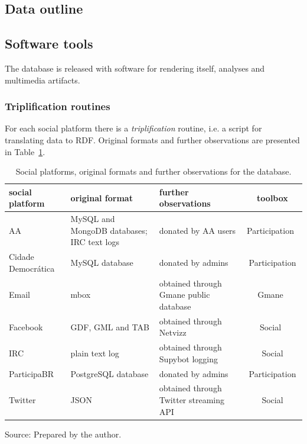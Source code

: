 \subsection{Data outline}


\subsection{Software tools}
The database is released with software for rendering itself, analyses and
multimedia artifacts.
\subsubsection{Triplification routines}
For each social platform there is a \emph{triplification} routine,
i.e. a script for translating data to RDF.
Original formats and further observations are presented in
Table~\ref{tab:provenance}.
\begin{table}[h!]\scriptsize
\begin{center}
\caption{Social platforms, original formats and further observations for
the database.}\label{tab:provenance}
\begin{tabular}{| l || p{3cm} | p{3cm} | c |}\hline
\textbf{social platform} & \textbf{original format} & \textbf{further observations} & \textbf{toolbox} \\\hline\hline
AA & MySQL and MongoDB databases; IRC text logs & donated by AA users & Participation~\cite{participation} \\\hline
Cidade Democrática & MySQL database & donated by admins & Participation \\\hline
Email & mbox & obtained through Gmane public database & Gmane~\cite{gmane} \\\hline
Facebook & GDF, GML and TAB & obtained through Netvizz~\cite{netvizz} & Social~\cite{social} \\\hline
IRC & plain text log & obtained through Supybot logging & Social \\\hline
ParticipaBR & PostgreSQL database & donated by admins & Participation \\\hline
Twitter & JSON & obtained through Twitter streaming API & Social \\\hline
\end{tabular}
\begin{flushleft}
Source: Prepared by the author.\
\end{flushleft}
\end{center}
\end{table} 


